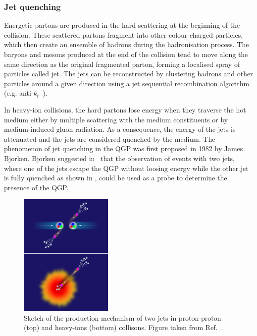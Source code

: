 \subsubsection{Jet quenching}\label{sec:Physics_HI_Probes_JetQuenching}

Energetic partons are produced in the hard scattering at the beginning of the collision. These scattered partons fragment into other colour-charged particles, which then create an ensemble of hadrons during the hadronisation process. The baryons and mesons produced at the end of the collision tend to move along the same direction as the original fragmented parton, forming a localised spray of particles called jet. The jets can be reconstructed by clustering hadrons and other particles around a given direction using a jet sequential recombination algorithm (e.g. anti-$k_{t}$~\cite{AntikT}).

In heavy-ion collisions, the hard partons lose energy when they traverse the hot medium either by multiple scattering with the medium constituents or by medium-induced gluon radiation. As a consequence, the energy of the jets is attenuated and the jets are considered quenched by the medium. The phenomenon of jet quenching in the QGP was first proposed in 1982 by James Bjorken. Bjorken suggested in~\cite{BjorkenJetQuenching} that the observation of events with two jets, where one of the jets escape the QGP without loosing energy while the other jet is fully quenched as shown in , could be used as a probe to determine the presence of the QGP.

\begin{figure}[!htb]
 \centering
 \includegraphics[width=0.4\textwidth]{Figures/Introduction/HeavyIons/JetQuenching.png}
 \caption{Sketch of the production mechanism of two jets in proton-proton (top) and heavy-ions (bottom) collisons. Figure taken from Ref.~\cite{FigureJetQuenching}.}
 \label{fig:JetQuenching}
\end{figure}

